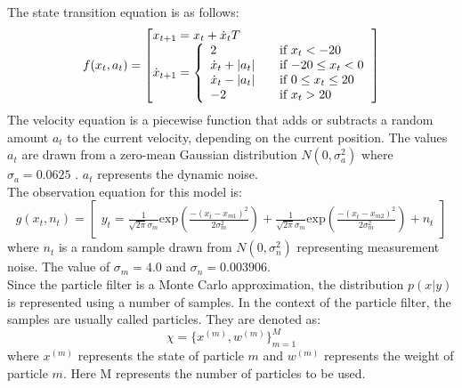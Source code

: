 \documentclass[12pt]{article}
\begin{document}
The state transition equation is as follows:
\begin{equation}
f(x_t,a_t) = \begin{bmatrix*}[l]
x_{t+1} = x_t + \dot{x}_t T \\
\dot{x}_{t+1} = \left\{
\begin{array}{l l}
  2 & \quad \text{if $x_t < -20$} \\
  \dot{x}_t + |a_t| & \quad \text{if $-20 \le x_t < 0$} \\
  \dot{x}_t - |a_t| & \quad \text{if $0 \le x_t \le 20$} \\
  -2 & \quad \text{if $x_t > 20$} \\
\end{array} \right.
\end{bmatrix*}
\label{eq:ST}
\end{equation}
The velocity equation is a piecewise function that adds or subtracts a random amount $a_t$ to the current velocity, depending on the current position. The values $a_t$ are drawn from a zero-mean Gaussian distribution $N(0,\sigma_a^2)$ where $\sigma_a = 0.0625$ . $a_t$ represents the dynamic noise.\\

The observation equation for this model is:
\begin{equation}
g(x_t,n_t) = \begin{bmatrix}
y_t = \frac{1}{\sqrt{2 \pi} \sigma_m}
\mathrm{exp} ( \frac{-(x_t - x_{m1})^2}{2 \sigma_m^2} ) +
\frac{1}{\sqrt{2 \pi} \sigma_m}
\mathrm{exp} ( \frac{-(x_t - x_{m2})^2}{2 \sigma_m^2} ) + n_t
\end{bmatrix}
\label{eq:obs}
\end{equation}
where $n_t$ is a random sample drawn from $N(0,\sigma_n^2)$ representing measurement noise. The value of $\sigma_m = 4.0$ and $\sigma_n = 0.003906$.\\

Since the particle filter is a Monte Carlo approximation, the distribution
$p(x|y)$ is represented using a number of samples.  In the context of
the particle filter, the samples are usually called particles.
They are denoted as:
\begin{equation}
\chi = \lbrace x^{(m)}, w^{(m)} \rbrace ^M_{m=1}
\end{equation} 
where $x^{(m)}$ represents the state of particle $m$ and
$w^{(m)}$ represents the weight of particle $m$.
Here M represents the number of particles to be used. \\
\end{document}
